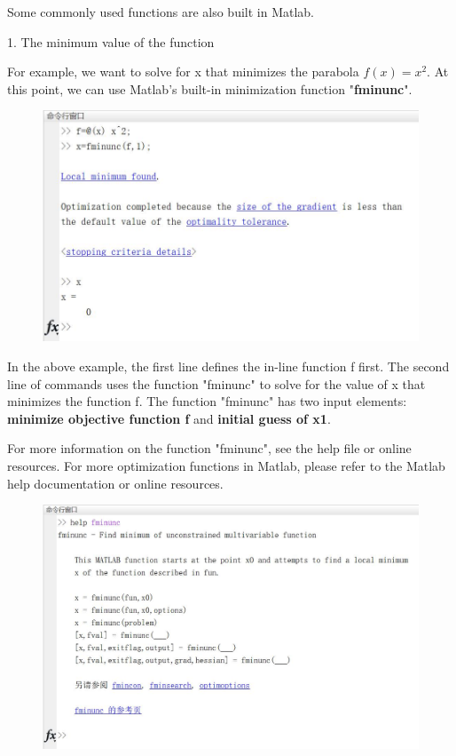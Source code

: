 \documentclass[10pt,math=newtx,citestyle=gb7714-2015,bibstyle=gb7714-2015]{elegantbook}
\begin{document}
{{{	Some commonly used functions are also built in Matlab.
	
	1. The minimum value of the function
	
	For example, we want to solve for x that minimizes the parabola $f(x)=x^2$. At this point, we can use Matlab's built-in minimization function "\textbf{fminunc}".
	
	\begin{figure}[htbp!]
		\centering
		\includegraphics[width=0.8\linewidth]{FIG/fminunc}
		\centering
	\end{figure}
	
	In the above example, the first line defines the in-line function f first. The second line of commands uses the function "fminunc" to solve for the value of x that minimizes the function f. The function "fminunc" has two input elements: \textbf{minimize objective function f} and \textbf{initial guess of x1}.
	
	For more information on the function "fminunc", see the help file or online resources. For more optimization functions in Matlab, please refer to the Matlab help documentation or online resources.
	
	\begin{figure}[htbp!]
		\centering
		\includegraphics[width=0.8\linewidth]{FIG/helpfminunc}
		\centering
	\end{figure}
	
}}}
\end{document}
